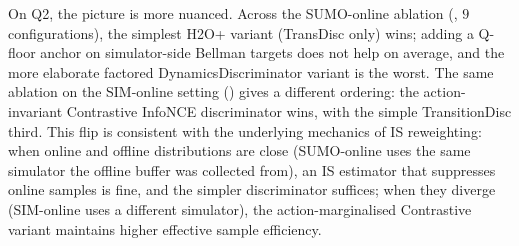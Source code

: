 On Q2, the picture is more nuanced.
Across the SUMO-online ablation (, $9$ configurations), the simplest H2O+ variant (TransDisc only) wins; adding a Q-floor anchor on simulator-side Bellman targets does not help on average, and the more elaborate factored DynamicsDiscriminator variant is the worst.
The same ablation on the SIM-online setting () gives a different ordering: the action-invariant Contrastive InfoNCE discriminator wins, with the simple TransitionDisc third.
This flip is consistent with the underlying mechanics of IS reweighting: when online and offline distributions are close (SUMO-online uses the same simulator the offline buffer was collected from), an IS estimator that suppresses online samples is fine, and the simpler discriminator suffices; when they diverge (SIM-online uses a different simulator), the action-marginalised Contrastive variant maintains higher effective sample efficiency.

